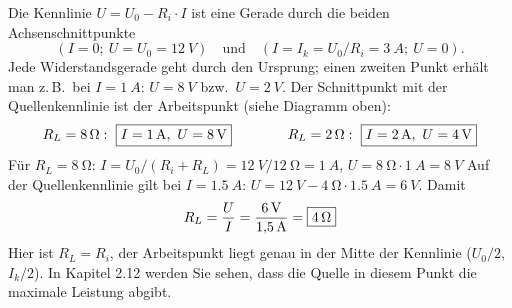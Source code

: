\documentclass[11pt,a4paper]{article}
\begin{document}
\begin{loesung}
Die Kennlinie $U = U_0 - R_i\cdot I$ ist eine Gerade durch die beiden Achsenschnittpunkte
\[
  (I = 0;\ U = U_0 = \SI{12}{V}) \quad\text{und}\quad (I = I_k = U_0/R_i = \SI{3}{A};\ U = 0).
\]
Jede Widerstandsgerade geht durch den Ursprung; einen zweiten Punkt erhält man z.\,B.\ bei $I = \SI{1}{A}$: $U = \SI{8}{V}$ bzw.\ $U = \SI{2}{V}$. Der Schnittpunkt mit der Quellenkennlinie ist der Arbeitspunkt (siehe Diagramm oben):
\[
  R_L = \SI{8}{\ohm}:\ \ergebnis{I = \SI{1}{A},\ U = \SI{8}{V}}
  \qquad\qquad
  R_L = \SI{2}{\ohm}:\ \ergebnis{I = \SI{2}{A},\ U = \SI{4}{V}}
\]
Für $R_L = \SI{8}{\ohm}$: $I = U_0/(R_i+R_L) = \SI{12}{V}/\SI{12}{\ohm} = \SI{1}{A}$, $U = \SI{8}{\ohm}\cdot\SI{1}{A} = \SI{8}{V}$ \checkmark
{}
Auf der Quellenkennlinie gilt bei $I = \SI{1.5}{A}$: $U = \SI{12}{V} - \SI{4}{\ohm}\cdot\SI{1.5}{A} = \SI{6}{V}$. Damit
\[
  R_L = \frac{U}{I} = \frac{\SI{6}{V}}{\SI{1.5}{A}} = \boxed{\SI{4}{\ohm}}
\]
Hier ist $R_L = R_i$, der Arbeitspunkt liegt genau in der Mitte der Kennlinie ($U_0/2$, $I_k/2$). In Kapitel 2.12 werden Sie sehen, dass die Quelle in diesem Punkt die maximale Leistung abgibt.
\end{loesung}
\end{document}
